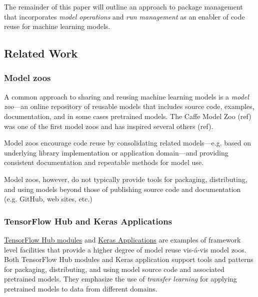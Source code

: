 \documentclass{article}
\begin{document}
\iffalse
While models may be represented in part by traditional installed
software---e.g. an imperative TensorFlow program that defines a model
graph structure when executed---models require more to be construed as
reusable code: \emph{models must support operations on novel data}. If
they cannot be applied to novel data---either for training or for
inference---they cannot be considered reusable software.
\fi

The remainder of this paper will outline an approach to package
management that incorporates \emph{model operations} and \emph{run
  management} as an enabler of code reuse for machine learning models.

\subsection{Related Work}

\subsubsection{Model zoos}

A common approach to sharing and reusing machine learning models is a
\emph{model zoo}---an online repository of reusable models that
includes source code, examples, documentation, and in some cases
pretrained models. The Caffe Model Zoo (ref) was one of the first
model zoos and has inspired several others (ref).

Model zoos encourage code reuse by consolidating related
models---e.g. based on underlying library implementation or
application domain---and providing consistent documentation and
repeatable methods for model use.

Model zoos, however, do not typically provide tools for packaging,
distributing, and using models beyond those of publishing source code
and documentation (e.g. GitHub, web sites, etc.)

\subsubsection{TensorFlow Hub and Keras Applications}

\href{https://www.tensorflow.org/hub/}{TensorFlow Hub modules} and
\href{https://keras.io/applications/}{Keras Applications} are examples
of framework level facilities that provide a higher degree of model
reuse vis-\'a-vis model zoos. Both TensorFlow Hub modules and Keras
application support tools and patterns for packaging, distributing,
and using model source code and associated pretrained models. They
emphasize the use of \emph{transfer learning} for applying pretrained
models to data from different domains.
\end{document}
